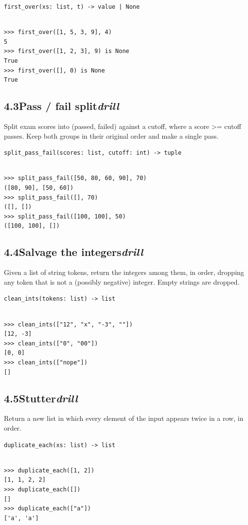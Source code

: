 \documentclass[10pt,letterpaper]{book}
\begin{document}
\noindent\texttt{first\_over(xs: list, t) -> value | None}
\begin{lstlisting}[style=ex]

>>> first_over([1, 5, 3, 9], 4)
5
>>> first_over([1, 2, 3], 9) is None
True
>>> first_over([], 0) is None
True

\end{lstlisting}
\subsection*{4.3\quad Pass / fail split\hfill\textnormal{\textit{drill}}}
Split exam scores into (passed, failed) against a cutoff, where a score >= cutoff passes. Keep both groups in their original order and make a single pass.

\noindent\texttt{split\_pass\_fail(scores: list, cutoff: int) -> tuple}
\begin{lstlisting}[style=ex]

>>> split_pass_fail([50, 80, 60, 90], 70)
([80, 90], [50, 60])
>>> split_pass_fail([], 70)
([], [])
>>> split_pass_fail([100, 100], 50)
([100, 100], [])

\end{lstlisting}
\subsection*{4.4\quad Salvage the integers\hfill\textnormal{\textit{drill}}}
Given a list of string tokens, return the integers among them, in order, dropping any token that is not a (possibly negative) integer. Empty strings are dropped.

\noindent\texttt{clean\_ints(tokens: list) -> list}
\begin{lstlisting}[style=ex]

>>> clean_ints(["12", "x", "-3", ""])
[12, -3]
>>> clean_ints(["0", "00"])
[0, 0]
>>> clean_ints(["nope"])
[]

\end{lstlisting}
\subsection*{4.5\quad Stutter\hfill\textnormal{\textit{drill}}}
Return a new list in which every element of the input appears twice in a row, in order.

\noindent\texttt{duplicate\_each(xs: list) -> list}
\begin{lstlisting}[style=ex]

>>> duplicate_each([1, 2])
[1, 1, 2, 2]
>>> duplicate_each([])
[]
>>> duplicate_each(["a"])
['a', 'a']

\end{lstlisting}
\end{document}
